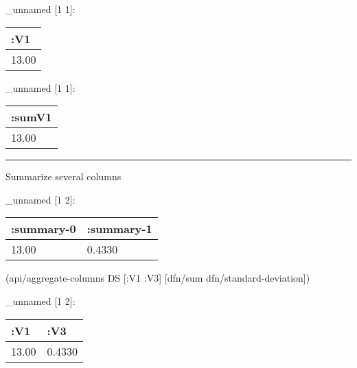 \documentclass[]{article}
\newenvironment{Shaded}{\begin{snugshade}}{\end{snugshade}}
\newcommand{\VariableTok}[1]{\textcolor[rgb]{0.00,0.00,0.00}{#1}}
\newcommand{\AttributeTok}[1]{\textcolor[rgb]{0.77,0.63,0.00}{#1}}
\newcommand{\NormalTok}[1]{#1}
\begin{document}
\_unnamed {[}1 1{]}:

\begin{longtable}[]{@{}l@{}}
\toprule
:V1\tabularnewline
\midrule
\endhead
13.00\tabularnewline
\bottomrule
\end{longtable}

\begin{Shaded}
\end{Shaded}

\_unnamed {[}1 1{]}:

\begin{longtable}[]{@{}l@{}}
\toprule
:sumV1\tabularnewline
\midrule
\endhead
13.00\tabularnewline
\bottomrule
\end{longtable}

\begin{center}\rule{0.5\linewidth}{0.5pt}\end{center}

Summarize several columns

\begin{Shaded}
\end{Shaded}

\_unnamed {[}1 2{]}:

\begin{longtable}[]{@{}ll@{}}
\toprule
:summary-0 & :summary-1\tabularnewline
\midrule
\endhead
13.00 & 0.4330\tabularnewline
\bottomrule
\end{longtable}

\begin{Shaded}
\begin{Highlighting}[]
\NormalTok{(api/aggregate-columns DS [}\AttributeTok{:V1} \AttributeTok{:V3}\NormalTok{] [dfn/sum}
\NormalTok{                                     dfn/standard-deviation])}
\end{Highlighting}
\end{Shaded}

\_unnamed {[}1 2{]}:

\begin{longtable}[]{@{}ll@{}}
\toprule
:V1 & :V3\tabularnewline
\midrule
\endhead
13.00 & 0.4330\tabularnewline
\bottomrule
\end{longtable}
\end{document}
